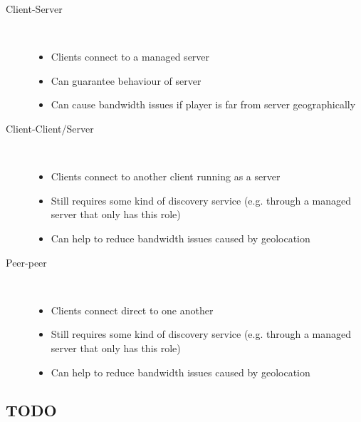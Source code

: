 \documentclass[a4paper]{article}
\begin{document}
\begin{description}
  \item[Client-Server] \hfill \\
    \begin{itemize}
      \item
        Clients connect to a managed server

      \item
        Can guarantee behaviour of server

      \item
        Can cause bandwidth issues if player is far from server geographically

    \end{itemize}

  \item[Client-Client/Server] \hfill \\
    \begin{itemize}
      \item
        Clients connect to another client running as a server

      \item
        Still requires some kind of discovery service (e.g. through a managed
        server that only has this role)

      \item
        Can help to reduce bandwidth issues caused by geolocation

    \end{itemize}

  \item[Peer-peer] \hfill \\
    \begin{itemize}
      \item
        Clients connect direct to one another

      \item
        Still requires some kind of discovery service (e.g. through a managed
        server that only has this role)

      \item
        Can help to reduce bandwidth issues caused by geolocation

    \end{itemize}

\end{description}

\subsection{TODO}
\end{document}
